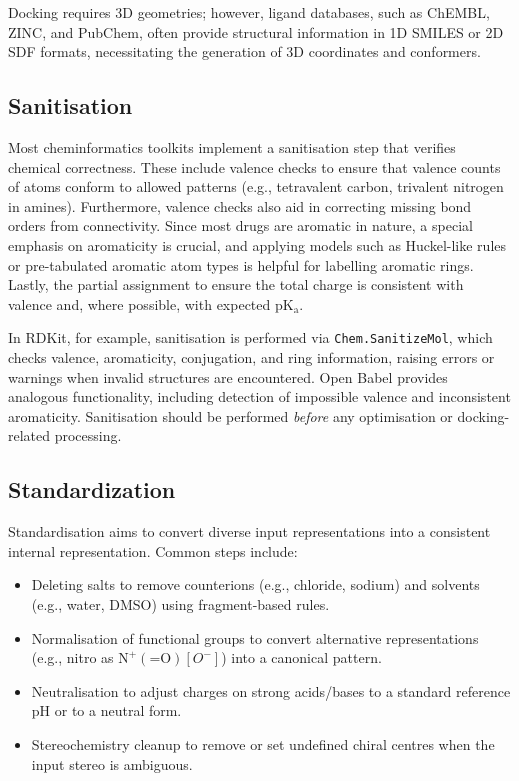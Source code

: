 \documentclass[12pt]{article}
\begin{document}
Docking requires 3D geometries; however, ligand databases, such as ChEMBL\cite{CH6_Gaulton2012}, ZINC\cite{CH6_Irwin2005}, and PubChem\cite{CH6_KimPubChem}, often provide structural information in 1D SMILES or 2D SDF formats, necessitating the generation of 3D coordinates and conformers.

\subsection{Sanitisation}

Most cheminformatics toolkits implement a sanitisation step that verifies chemical correctness. These include valence checks to ensure that valence counts of atoms conform to allowed patterns (e.g., tetravalent carbon, trivalent nitrogen in amines). Furthermore, valence checks also aid in correcting missing bond orders from connectivity. Since most drugs are aromatic in nature, a special emphasis on aromaticity is crucial, and applying models such as Huckel-like rules or pre-tabulated aromatic atom types is helpful for labelling aromatic rings. Lastly, the partial assignment to ensure the total charge is consistent with valence and, where possible, with expected p$\textrm{K}_\textrm{a}$.

In RDKit\cite{CH6_bento2020open}, for example, sanitisation is performed via \verb|Chem.SanitizeMol|, which checks valence, aromaticity, conjugation, and ring information, raising errors or warnings when invalid structures are encountered. Open Babel\cite{CH6_OBoyle2011} provides analogous functionality, including detection of impossible valence and inconsistent aromaticity. Sanitisation should be performed \emph{before} any optimisation or docking-related processing. 

\subsection{Standardization}
Standardisation aims to convert diverse input representations into a consistent internal representation. Common steps include:
\begin{itemize}
  \item Deleting salts to remove counterions (e.g., chloride, sodium) and solvents (e.g., water, DMSO) using fragment-based rules.
  \item Normalisation of functional groups to convert alternative representations (e.g., nitro as $\textrm{N}^{+}(\textrm{=O})[O^-]$) into a canonical pattern.
  \item Neutralisation to adjust charges on strong acids/bases to a standard reference pH or to a neutral form.
  \item Stereochemistry cleanup to remove or set undefined chiral centres when the input stereo is ambiguous.
\end{itemize}
\end{document}
